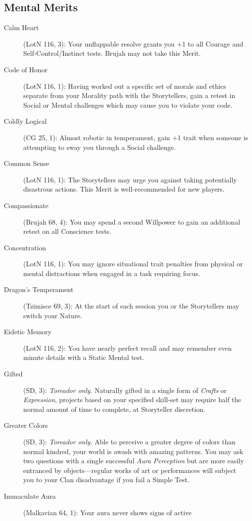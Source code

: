 \subsection{Mental Merits}
\begin{description}
	\item[Calm Heart] (LotN 116, 3):  Your unflappable resolve grants you +1 to all 
	Courage and Self-Control/Instinct tests.  Brujah may not take this Merit.
	\item[Code of Honor] (LotN 116, 1):  Having worked out a specific set of morals and 
	ethics separate from your Morality path with the Storytellers, gain a retest in 
	Social or Mental challenges which may cause you to violate your code.
	\item[Coldly Logical] (CG 25, 1):  Almost robotic in temperament, gain +1 trait when 
	someone is attempting to sway you through a Social challenge.
	\item[Common Sense] (LotN 116, 1):  The Storytellers may urge you against taking 
	potentially disastrous actions.  This Merit is well-recommended for new players.
	\item[Compassionate] (Brujah 68, 4):  You may spend a second Willpower to gain an 
	additional retest on all Conscience tests.
	\item[Concentration] (LotN 116, 1):  You may ignore situational trait penalties from 
	physical or mental distractions when engaged in a task requiring focus.
	\item[Dragon's Temperament] (Tzimisce 69, 3):  At the start of each session you or the 
	Storytellers may switch your Nature.
	\item[Eidetic Memory] (LotN 116, 2):  You have nearly perfect recall and may remember 
	even minute details with a Static Mental test.
	\item[Gifted] (SD, 3):  \emph{Toreador only.}  Naturally gifted in a single 
	form of \emph{Crafts} or \emph{Expression}, projects based on your specified skill-set 
	may require half the normal amount of time to complete, at Storyteller discretion.
	\item[Greater Colors] (SD, 3):  \emph{Toreador only.}  Able to perceive a greater 
	degree of colors than normal kindred, your world is awash with amazing patterns.  You may ask 
	two questions with a single successful \emph{Aura Perception} but are more easily entranced 
	by objects---regular works of art or performances will subject you to your Clan disadvantage if 
	you fail a Simple Test.
	\item[Immaculate Aura] (Malkavian 64, 1):  Your aura never shows signs of active 

\end{description}
